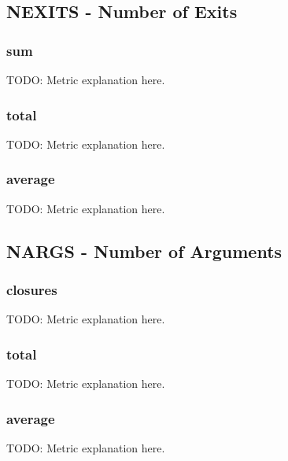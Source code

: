 \subsection{NEXITS - Number of Exits}

\subsubsection{sum}
TODO: Metric explanation here.

\subsubsection{total}
TODO: Metric explanation here.

\subsubsection{average}
TODO: Metric explanation here.

\subsection{NARGS - Number of Arguments}

\subsubsection{closures}
TODO: Metric explanation here.

\subsubsection{total}
TODO: Metric explanation here.

\subsubsection{average}
TODO: Metric explanation here.
